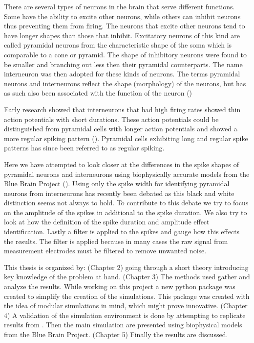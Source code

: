 \documentclass[altfont, fleqn]{uiophd}
\begin{document}
There are several types of neurons in the brain that serve 
different functions. 
Some have the ability to excite other neurons, while
others can inhibit neurons thus preventing them from firing. 
The neurons that excite other neurons tend to have longer
shapes than those that inhibit. 
Excitatory neurons of this kind are called pyramidal 
neurons from the characteristic shape of the soma 
which is comparable to a cone or pyramid. 
The shape of inhibitory neurons were found to be smaller
and branching out less then their pyramidal counterparts.
The name interneuron was then adopted for these kinds of neurons. 
The terms pyramidal neurons and interneurons 
reflect the shape (morphology) of the neurons, 
but has as such also been associated with the function
of the neuron 
(\textcite{freund_interneurons_2008, spruston_pyramidal_2009})

Early research showed that interneurons that had 
high firing rates
showed thin action potentials with short durations. 
These action potentials could be distinguished from pyramidal 
cells with longer action potentials and showed a 
more regular spiking pattern
(\textcite{mountcastle_cortical_1969}).
Pyramidal cells exhibiting long and regular spike patterns
has since been referred to as regular spiking. 
\newline

Here we have attempted to look closer at the differences in 
the spike shapes of pyramidal neurons and interneurons
using biophysically accurate models from the Blue Brain Project
(\textcite{ramaswamy_neocortical_2015}).
Using only the spike width for identifying pyramidal neurons
from interneurons has recently been debated
as this black and white distinction seems not always to hold. 
To contribute to this debate we try to
focus on the amplitude of the spikes in additional to the spike
duration. 
We also try to look at how the definition
of the spike duration and amplitude effect identification.
Lastly a filter is applied to the spikes and gauge how this
effects the results. 
The filter is applied because in many cases the raw
signal from measurement electrodes must be filtered to remove
unwanted noise. 

This thesis is organized by: (Chapter 2) going through a short
theory introducing key knowledge of the problem at hand.
(Chapter 3) The methods used gather and analyze the results. 
While working on this project a new python package was created
to simplify the creation of the simulations. 
This package was created with the idea of modular simulations
in mind, which might prove innovative. 
(Chapter 4) A validation of the simulation environment is
done by attempting to replicate results from 
\textcite{pettersen_amplitude_2008}. 
Then the main simulation are presented using biophysical
models from the Blue Brain Project.
(Chapter 5) Finally the results are discussed.
\end{document}
